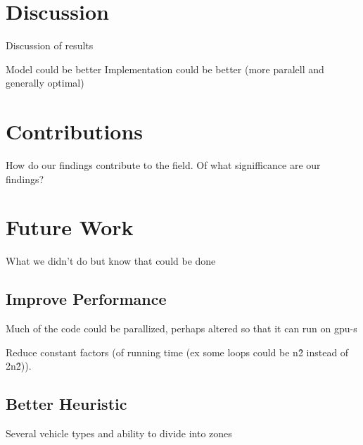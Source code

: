 

\section{Discussion}
Discussion of results

Model could be better
Implementation could be better (more paralell and generally optimal)



\section{Contributions}
How do our findings contribute to the field. Of what signifficance are our findings?

\section{Future Work}
What we didn't do but know that could be done

\subsection{Improve Performance}
Much of the code could be parallized, perhaps altered so that it can run on gpu-s

Reduce constant factors (of running time (ex some loops could be n\^2 instead of 2\*n\^2)).

\subsection{Better Heuristic}
Several vehicle types and ability to divide into zones

